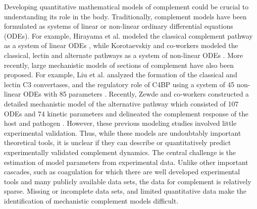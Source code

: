 \documentclass[12pt]{article}
\begin{document}
Developing quantitative mathematical models of complement could be crucial to understanding its role in the body.
Traditionally, complement models have been formulated as systems of linear or non-linear ordinary differential equations (ODEs).
For example, Hirayama et al. modeled the classical complement pathway as a system of linear ODEs \cite{hirayama1996linear},
while Korotaevskiy and co-workers modeled the classical, lectin and alternate pathways as a system of non-linear ODEs \cite{korotaevskiy2009non}.
More recently, large mechanistic models of sections of complement have also been proposed.
For example, Liu et al. analyzed the formation of the classical and lectin C3 convertases, and the regulatory role of C4BP using a system of 45 non-linear ODEs with 85 parameters \cite{liu2011computational}.
Recently, Zewde and co-workers constructed a detailed mechanistic model of the alternative pathway which consisted of 107 ODEs and 74 kinetic parameters and delineated
the complement response of the host and pathogen \cite{zewde2016quantitative}.
However, these previous modeling studies involved little experimental validation.
Thus, while these models are undoubtably important theoretical tools, it is unclear if they can describe or quantitatively predict experimentally validated complement dynamics.
The central challenge is the estimation of model parameters from experimental data.
Unlike other important cascades, such as coagulation for which there are well developed experimental tools and many publicly available data sets,
the data for complement is relatively sparse. Missing or incomplete data sets, and limited quantitative data make the identification of mechanistic complement models difficult.
\end{document}
